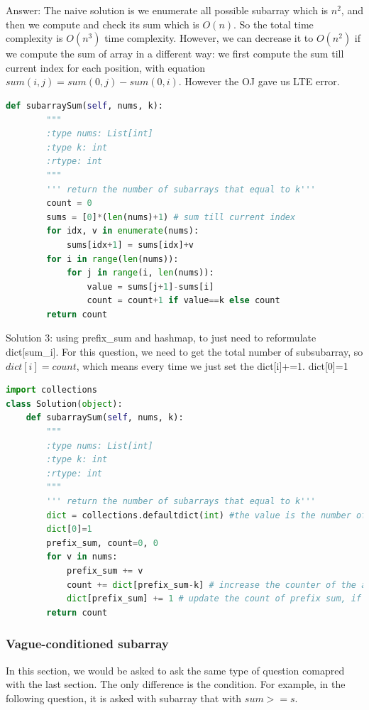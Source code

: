 \documentclass[../specific-algorithms.tex]{subfiles}
\begin{document}
Answer: The naive solution is we enumerate all possible subarray which is $n^2$, and then we compute and check its sum which is $O(n)$. So the total time complexity is  $O(n^3)$ time complexity. However, we can decrease it to $O(n^2)$ if we compute the sum of array in a different way: we first compute the sum till current index for each position, with equation $sum(i,j) = sum(0,j)-sum(0,i)$. However the OJ gave us LTE error. 
\begin{lstlisting}[language = Python]
def subarraySum(self, nums, k):
        """
        :type nums: List[int]
        :type k: int
        :rtype: int
        """
        ''' return the number of subarrays that equal to k'''
        count = 0
        sums = [0]*(len(nums)+1) # sum till current index
        for idx, v in enumerate(nums):
            sums[idx+1] = sums[idx]+v
        for i in range(len(nums)):
            for j in range(i, len(nums)):
                value = sums[j+1]-sums[i]
                count = count+1 if value==k else count
        return count
\end{lstlisting}

Solution 3: using prefix\_sum and hashmap, to just need to reformulate dict[sum\_i]. For this question, we need to get the total number of subsubarray, so $dict[i] = count$, which means every time we just set the dict[i]+=1. dict[0]=1
\begin{lstlisting}[language = Python]
import collections
class Solution(object):
    def subarraySum(self, nums, k):
        """
        :type nums: List[int]
        :type k: int
        :rtype: int
        """
        ''' return the number of subarrays that equal to k'''
        dict = collections.defaultdict(int) #the value is the number of the sum occurs
        dict[0]=1
        prefix_sum, count=0, 0
        for v in nums:
            prefix_sum += v
            count += dict[prefix_sum-k] # increase the counter of the appearing value k, default is 0
            dict[prefix_sum] += 1 # update the count of prefix sum, if it is first time, the default value is 0
        return count
\end{lstlisting}



\subsubsection{Vague-conditioned subarray}
In this section, we would be asked to ask the same type of question comapred with the last section. The only difference is the condition. For example, in the following question, it is asked with subarray that with $sum >= s$. 
\end{document}
